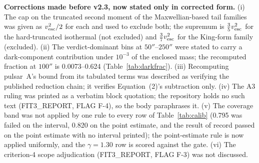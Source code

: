 \documentclass[11pt]{article}
\begin{document}
\textbf{Corrections made before v2.3, now stated only in corrected form.} (i) The cap on the truncated second moment of the Maxwellian-based tail families was given as $v_{\rm esc}^{2}/2$ for each and used to exclude both; the supremum is $\tfrac{3}{5}v_{\rm esc}^{2}$ for the hard-truncated isothermal (not excluded) and $\tfrac{3}{7}v_{\rm esc}^{2}$ for the King-form family (excluded). (ii) The verdict-dominant bins at $50''$--$250''$ were stated to carry a dark-component contribution under $10^{-3}$ of the enclosed mass; the recomputed fraction at $100''$ is 0.0073--0.624 (Table~\ref{tab:darkfrac}). (iii) Recomputing pulsar~A's bound from its tabulated terms was described as verifying the published reduction chain; it verifies Equation~(2)'s subtraction only. (iv) The A3 ruling was printed as a verbatim block quotation; the repository holds no such text (FIT3\_REPORT, FLAG F-4), so the body paraphrases it. (v) The coverage band was not applied by one rule to every row of Table~\ref{tab:calib} (0.795 was failed on the interval, 0.820 on the point estimate, and the result of record passed on the point estimate with no interval printed); the point-estimate rule is now applied uniformly, and the $\gamma = 1.30$ row is scored against the gate. (vi) The criterion-4 scope adjudication (FIT3\_REPORT, FLAG F-3) was not discussed.
\end{document}
